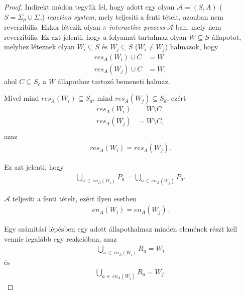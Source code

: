\documentclass[12pt]{article}
\theoremstyle{definition}
\theoremstyle{remark}
\theoremstyle{plain}
\theoremstyle{plain}
\newcommand{\en}{\textit{en}}
\newcommand{\res}{\textit{res}}
\begin{document}
    \begin{proof}
        Indirekt módon tegyük fel, hogy adott egy olyan $\mathscr{A}=(S, A)$ ($S = \Sigma_{p} \cup \Sigma_{c}$) \textit{reaction system}, mely teljesíti a fenti tételt, azonban nem reverzibilis. Ekkor létezik olyan $\pi$ \textit{interactive process} $\mathscr{A}$-ban, mely nem reverzibilis. Ez azt jelenti, hogy a folyamat tartalmaz olyan $W \subseteq S$ állapotot, melyhez léteznek olyan $W_{i} \subseteq S$ és $W_{j} \subseteq S$ ($W_{i} \neq W_{j}$) halmazok, hogy
        \begin{align*}
            \res_{A}(W_{i}) \cup C &= W \\
            \res_{A}(W_{j}) \cup C &= W,
        \end{align*}
        ahol $C \subseteq S_{c}$ a $W$ állapothoz tartozó bemeneti halmaz. 
        
        Mivel mind $\res_{A}(W_{i}) \subseteq S_{d}$, mind $\res_{A}(W_{j}) \subseteq S_{d}$, ezért
        \begin{align*}
            \res_{A}(W_{i}) &= W \setminus C \\
            \res_{A}(W_{j}) &= W \setminus C, \\
        \end{align*}
        azaz
        \begin{align*}
            \res_{A}(W_{i}) = \res_{A}(W_{j}).
        \end{align*}

        Ez azt jelenti, hogy
        \begin{align*}
            \bigcup\limits_{a \,\in\, \en_{A}(W_{i})}P_{a} = \bigcup\limits_{a \,\in\, \en_{A}(W_{j})}P_{a}.
        \end{align*}

        $\mathscr{A}$ teljesíti a fenti tételt,  ezért ilyen esetben
        \begin{align*}
            \en_{A}(W_{i}) = \en_{A}(W_{j}).
        \end{align*}

        Egy számítási lépésben egy adott állapothalmaz minden elemének részt kell vennie legalább egy reakcióban, azaz
        \begin{align*}
            \bigcup\limits_{a \,\in\, \en_{A}(W_{i})} R_{a} = W_{i}
        \end{align*}
        és
        \begin{align*}
            \bigcup\limits_{a \,\in\, \en_{A}(W_{j})} R_{a} = W_{j}.
        \end{align*}


\end{proof}
\end{document}
